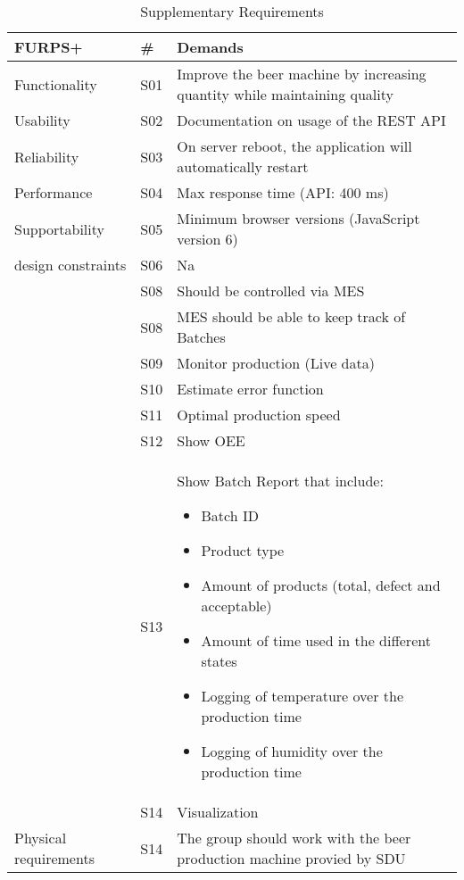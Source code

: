 \begin{table}[ht]
    \begin{tabularx}{\textwidth}{|>{\RaggedRight}p{3.3cm}|>{\RaggedRight}p{0.6cm}|>{\RaggedRight}X|}
        \hline
        \textbf{FURPS+}  & \textbf{\#} & \textbf{Demands} \\
        \hline
        Functionality  	& S01 & Improve the beer machine by increasing quantity while maintaining quality \\
        \hline
        Usability      	& S02 & Documentation on usage of the REST API \\
        \hline
        Reliability    	& S03 & On server reboot, the application will automatically restart \\
        \hline
        Performance    	& S04 & Max response time (API: 400 ms) \\
        \hline
        Supportability 	& S05 & Minimum browser versions (JavaScript version 6)\\
        \hline
        design constraints 	& S06 & Na \\
        \hline
        \multirow{5}{100}{implementation requirements} & S08 & Should be controlled via MES\\
        \cline{2-3}
                & S08 & MES should be able to keep track of Batches\\
        \cline{2-3}
                & S09 & Monitor production (Live data)\\
        \cline{2-3}
                & S10 & Estimate error function\\
        \cline{2-3}
                & S11 & Optimal production speed\\
        \hline
        \multirow{14}{100}{Interface requirements } & S12 & Show OEE \\
        \cline{2-3}
                & S13 & Show Batch Report that include:
            \begin{itemize}
                \item Batch ID
                \item Product type
                \item Amount of products (total, defect and acceptable)
                \item Amount of time used in the different states
                \item Logging of temperature over the production time
                \item Logging of humidity over the production time
            \end{itemize} \\
        \cline{2-3}
            & S14 & Visualization \\
        \hline
        Physical requirements & S14 & The group should work with the beer 
        production machine provied by SDU \\
        \hline
    \end{tabularx}
    \caption{Supplementary Requirements} 
    \label{table:Sup_requirements}
\end{table} 

